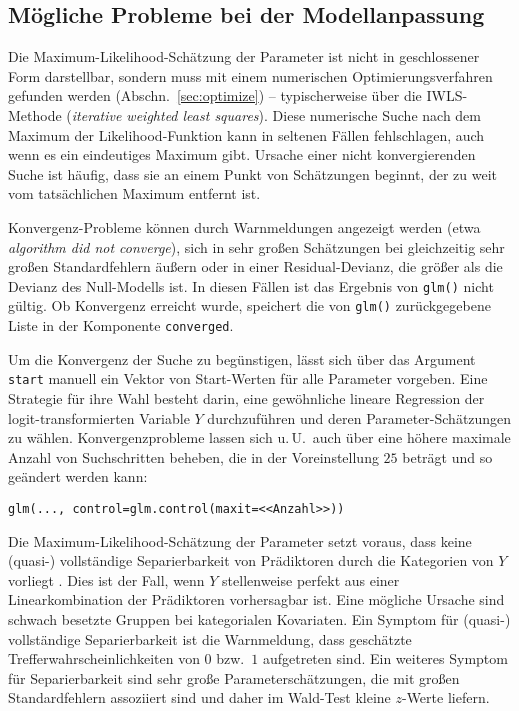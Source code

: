 \subsection{Mögliche Probleme bei der Modellanpassung}
\label{sec:glmConvergence}

Die Maximum-Likelihood-Schätzung der Parameter ist nicht in geschlossener Form darstellbar, sondern muss mit einem numerischen Optimierungsverfahren gefunden werden (Abschn.\ \ref{sec:optimize}) -- typischerweise über die IWLS-Methode (\emph{iterative weighted least squares}). Diese numerische Suche nach dem Maximum der Likelihood-Funktion kann in seltenen Fällen fehlschlagen, auch wenn es ein eindeutiges Maximum gibt. Ursache einer nicht konvergierenden Suche ist häufig, dass sie an einem Punkt von Schätzungen beginnt, der zu weit vom tatsächlichen Maximum entfernt ist.

Konvergenz-Probleme können durch Warnmeldungen angezeigt werden (etwa \emph{algorithm did not converge}), sich in sehr großen Schätzungen bei gleichzeitig sehr großen Standardfehlern äußern oder in einer Residual-Devianz, die größer als die Devianz des Null-Modells ist. In diesen Fällen ist das Ergebnis von \lstinline!glm()! nicht gültig. Ob Konvergenz erreicht wurde, speichert die von \lstinline!glm()! zurückgegebene Liste in der Komponente \lstinline!converged!.

Um die Konvergenz der Suche zu begünstigen, lässt sich über das Argument \lstinline!start! manuell ein Vektor von Start-Werten für alle Parameter vorgeben. Eine Strategie für ihre Wahl besteht darin, eine gewöhnliche lineare Regression der logit-transformierten Variable $Y$ durchzuführen und deren Parameter-Schätzungen zu wählen. Konvergenzprobleme lassen sich u.\,U.\ auch über eine höhere maximale Anzahl von Suchschritten beheben, die in der Voreinstellung $25$ beträgt und so geändert werden kann:
\begin{lstlisting}
glm(..., control=glm.control(maxit=<<Anzahl>>))
\end{lstlisting}

Die Maximum-Likelihood-Schätzung der Parameter setzt voraus, dass keine (quasi-) vollständige Separierbarkeit von Prädiktoren durch die Kategorien von $Y$ vorliegt \cite{Allison2008, Allison2003}. Dies ist der Fall, wenn $Y$ stellenweise perfekt aus einer Linearkombination der Prädiktoren vorhersagbar ist. Eine mögliche Ursache sind schwach besetzte Gruppen bei kategorialen Kovariaten. Ein Symptom für (quasi-) vollständige Separierbarkeit ist die Warnmeldung, dass geschätzte Trefferwahrscheinlichkeiten von $0$ bzw.\ $1$ aufgetreten sind. Ein weiteres Symptom für Separierbarkeit sind sehr große Parameterschätzungen, die mit großen Standardfehlern assoziiert sind und daher im Wald-Test kleine $z$-Werte liefern.

